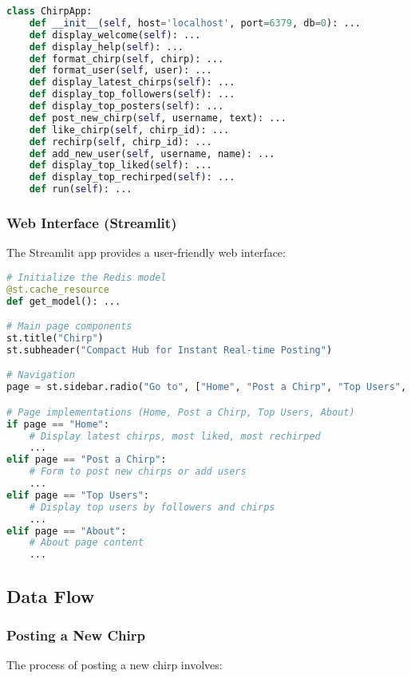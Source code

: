 \documentclass[a4paper,11pt]{article}
\begin{document}
\begin{lstlisting}[language=Python, caption=ChirpApp class structure]
class ChirpApp:
    def __init__(self, host='localhost', port=6379, db=0): ...
    def display_welcome(self): ...
    def display_help(self): ...
    def format_chirp(self, chirp): ...
    def format_user(self, user): ...
    def display_latest_chirps(self): ...
    def display_top_followers(self): ...
    def display_top_posters(self): ...
    def post_new_chirp(self, username, text): ...
    def like_chirp(self, chirp_id): ...
    def rechirp(self, chirp_id): ...
    def add_new_user(self, username, name): ...
    def display_top_liked(self): ...
    def display_top_rechirped(self): ...
    def run(self): ...
\end{lstlisting}

\subsubsection{Web Interface (Streamlit)}
The Streamlit app provides a user-friendly web interface:

\begin{lstlisting}[language=Python, caption=Streamlit app structure]
# Initialize the Redis model
@st.cache_resource
def get_model(): ...

# Main page components
st.title("Chirp")
st.subheader("Compact Hub for Instant Real-time Posting")

# Navigation
page = st.sidebar.radio("Go to", ["Home", "Post a Chirp", "Top Users", "About"])

# Page implementations (Home, Post a Chirp, Top Users, About)
if page == "Home":
    # Display latest chirps, most liked, most rechirped
    ...
elif page == "Post a Chirp":
    # Form to post new chirps or add users
    ...
elif page == "Top Users":
    # Display top users by followers and chirps
    ...
elif page == "About":
    # About page content
    ...
\end{lstlisting}

\subsection{Data Flow}

\subsubsection{Posting a New Chirp}
The process of posting a new chirp involves:
\end{document}
